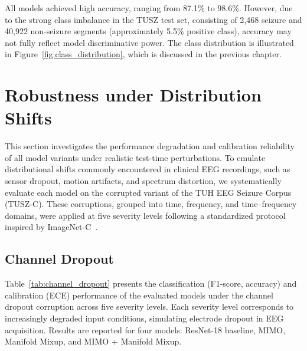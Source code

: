 All models achieved high accuracy, ranging from 87.1\% to 98.6\%. However, due to the strong class imbalance in the TUSZ test set, consisting of 2,468 seizure and 40,922 non-seizure segments (approximately 5.5\% positive class), accuracy may not fully reflect model discriminative power. The class distribution is illustrated in Figure~\ref{fig:class_distribution}, which is discussed in the previous chapter.

\section{Robustness under Distribution Shifts}
This section investigates the performance degradation and calibration reliability of all model variants under realistic test-time perturbations. To emulate distributional shifts commonly encountered in clinical EEG recordings, such as sensor dropout, motion artifacts, and spectrum distortion, we systematically evaluate each model on the corrupted variant of the TUH EEG Seizure Corpus (TUSZ-C). These corruptions, grouped into time, frequency, and time–frequency domains, were applied at five severity levels following a standardized protocol inspired by ImageNet-C~\cite{benchmarkingneuralnetworkrobustness}.

\subsection{Channel Dropout}
\label{subsec:channel_dropout}

Table~\ref{tab:channel_dropout} presents the classification (F1-score, accuracy) and calibration (ECE) performance of the evaluated models under the channel dropout corruption across five severity levels. Each severity level corresponds to increasingly degraded input conditions, simulating electrode dropout in EEG acquisition. Results are reported for four models: ResNet-18 baseline, MIMO, Manifold Mixup, and MIMO + Manifold Mixup.

